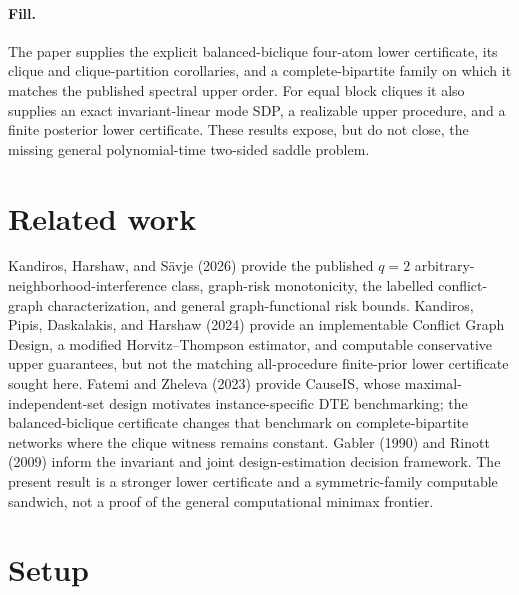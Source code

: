\documentclass{article}
\begin{document}
\paragraph{Fill.} The paper supplies the explicit balanced-biclique four-atom lower certificate, its clique and clique-partition corollaries, and a complete-bipartite family on which it matches the published spectral upper order. For equal block cliques it also supplies an exact invariant-linear mode SDP, a realizable upper procedure, and a finite posterior lower certificate. These results expose, but do not close, the missing general polynomial-time two-sided saddle problem.

\section{Related work}

Kandiros, Harshaw, and Sävje (2026) provide the published \(q=2\) arbitrary-neighborhood-interference class, graph-risk monotonicity, the labelled conflict-graph characterization, and general graph-functional risk bounds. Kandiros, Pipis, Daskalakis, and Harshaw (2024) provide an implementable Conflict Graph Design, a modified Horvitz--Thompson estimator, and computable conservative upper guarantees, but not the matching all-procedure finite-prior lower certificate sought here. Fatemi and Zheleva (2023) provide CauseIS, whose maximal-independent-set design motivates instance-specific DTE benchmarking; the balanced-biclique certificate changes that benchmark on complete-bipartite networks where the clique witness remains constant. Gabler (1990) and Rinott (2009) inform the invariant and joint design-estimation decision framework. The present result is a stronger lower certificate and a symmetric-family computable sandwich, not a proof of the general computational minimax frontier.

\section{Setup}
\end{document}
